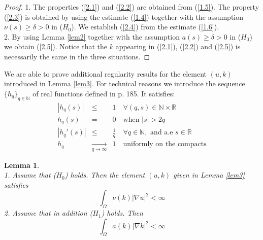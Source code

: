 \documentclass{elsart}
\newtheorem{lemm}[defi]{Lemma}
\begin{document}
\begin{proof}
1. The properties (\ref{2.1}) and (\ref{2.2}) are obtained from
   (\ref{1.5}). The property (\ref{2.3}) is obtained by using the
   estimate (\ref{1.4}) together with the assumption $\nu(s) \geq
   \delta > 0$ in ($H_0$). We establish (\ref{2.4}) from the estimate 
(\ref{1.6}). \\ 

2. By using Lemma \ref{lem2} together with the assumption $a(s)\geq
   \delta > 0$ in ($H_0$) we obtain (\ref{2.5}). Notice that the $k$
   appearing in (\ref{2.1}), (\ref{2.2}) and (\ref{2.5}) is necessarily
   the same in the three situations. 
\end{proof}

We are able to prove additional regularity results for the 
element $(u,k)$ introduced in Lemma \ref{lem3}. For technical reasons
we introduce the sequence $\{h_q\}_{q \in \mathbb N}$ of real functions
defined in \cite{lewan} p. 185. It satisfies: 
\begin{eqnarray}
|h_q(s)| &\leq& 1 \quad \forall (q,s) \in \mathbb N \times \mathbb R
 \label{p1} \\
h_q(s) &=& 0 \quad \text{when } |s| > 2q \label{p0} \\ 
|h_q'(s)| &\leq& \frac{1}{q} \quad \forall q \in \mathbb N, \text{ and
 a.e } s \in \mathbb R
 \label{p2} \\ 
h_q &\underset{q \to \infty}{\rightarrow}& 1\quad \text{uniformly on
  the compacts} \label{p3}
\end{eqnarray}
 

\begin{lemm}\label{lem4} \noindent \\  
1. Assume that ($H_0$) holds. Then the element $(u,k)$ given in
   Lemma \ref{lem3} satisfies
\begin{equation}
\int_{\Omega} \nu(k)|\nabla u |^2 < \infty \label{2.6}
\end{equation}
2. Assume that in addition ($H_1$) holds. Then 
\begin{equation}
\int_{\Omega} a(k)|\nabla k |^2 < \infty \label{2.7}
\end{equation}
\end{lemm}
\end{document}
